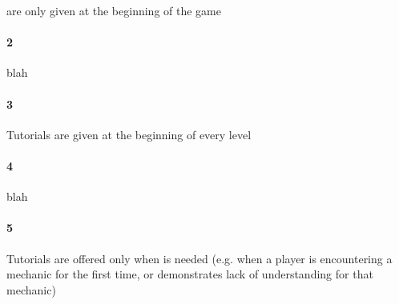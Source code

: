 are only given at the beginning of the game\paragraph{2}blah\paragraph{3}Tutorials are given at the beginning of every level\paragraph{4}blah\paragraph{5}Tutorials are offered only when is needed (e.g. when a player is encountering a mechanic for the first time, or demonstrates lack of understanding for that mechanic)